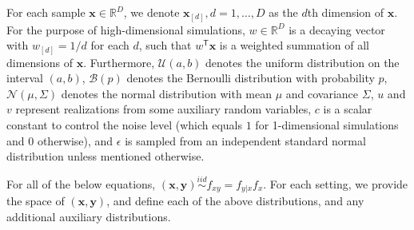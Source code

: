 \documentclass[11pt]{article}
\providecommand{\mb}[1]{\boldsymbol{#1}}
\providecommand{\mc}[1]{\mathcal{#1}}
\newcommand{\Real}{\mathbb{R}}
\newcommand{\T}{^{\ensuremath{\mathsf{T}}}}           %
\newcommand{\mbx}{\ensuremath{\mb{x}}}
\newcommand{\mby}{\ensuremath{\mb{y}}}
\begin{document}
For each sample $\mbx \in \Real^{D}$, we denote $\mbx_{[d]}, d=1,\ldots,D$ as the $d$th dimension of \mbx. For the purpose of high-dimensional simulations, $w \in \Real^{D}$ is a decaying vector with $w_{[d]}=1/d$ for each $d$, such that $w\T \mbx$ is a 
weighted summation of all dimensions of \mbx. %
Furthermore, $\mc{U}(a,b)$ denotes the uniform distribution on the interval $(a,b)$, $\mc{B}(p)$ denotes the Bernoulli distribution with probability $p$, $\mc{N}(\mu,{\Sigma})$ denotes the normal distribution with mean ${\mu}$ and covariance ${\Sigma}$, 
$u$ and $v$ represent realizations from some auxiliary random variables, $c$ is a scalar constant to control the noise level (which equals $1$ for 1-dimensional simulations and $0$ otherwise), and $\epsilon$ is sampled from an independent standard normal distribution unless mentioned otherwise.

For all of the below equations, $(\mbx,\mby) \overset{iid}{\sim} f_{xy} = f_{y|x} f_x$. For each setting, we provide the space of $(\mbx,\mby)$, and define each of the above distributions, and any additional auxiliary distributions.
\end{document}
